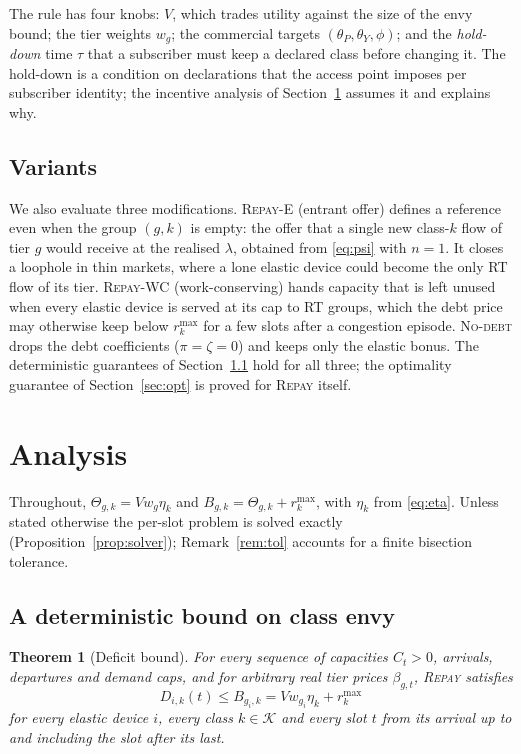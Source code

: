 \documentclass[preprint,11pt]{elsarticle}
\newtheorem{theorem}{Theorem}
\theoremstyle{definition}
\theoremstyle{remark}
\newcommand{\rmax}{r^{\max}}
\newcommand{\cK}{\mathcal{K}}
\newcommand{\repay}{\textsc{Repay}}
\begin{document}
The rule has four knobs: $V$, which trades utility against the size of the envy bound; the tier weights $w_g$; the commercial targets $(\theta_P,\theta_Y,\phi)$; and the \emph{hold-down} time $\tau$ that a subscriber must keep a declared class before changing it.
The hold-down is a condition on declarations that the access point imposes per subscriber identity; the incentive analysis of Section~\ref{sec:analysis} assumes it and explains why.

\subsection{Variants}\label{sec:variants}

We also evaluate three modifications.
\textsc{Repay-E} (entrant offer) defines a reference even when the group $(g,k)$ is empty: the offer that a single new class-$k$ flow of tier $g$ would receive at the realised $\lambda$, obtained from \eqref{eq:psi} with $n=1$. It closes a loophole in thin markets, where a lone elastic device could become the only RT flow of its tier.
\textsc{Repay-WC} (work-conserving) hands capacity that is left unused when every elastic device is served at its cap to RT groups, which the debt price may otherwise keep below $\rmax_k$ for a few slots after a congestion episode.
\textsc{No-debt} drops the debt coefficients ($\pi=\zeta=0$) and keeps only the elastic bonus.
The deterministic guarantees of Section~\ref{sec:envy} hold for all three; the optimality guarantee of Section~\ref{sec:opt} is proved for \repay{} itself.


\section{Analysis}\label{sec:analysis}

Throughout, $\Theta_{g,k}=V w_g\eta_k$ and $B_{g,k}=\Theta_{g,k}+\rmax_k$, with $\eta_k$ from \eqref{eq:eta}.
Unless stated otherwise the per-slot problem is solved exactly (Proposition~\ref{prop:solver}); Remark~\ref{rem:tol} accounts for a finite bisection tolerance.

\subsection{A deterministic bound on class envy}\label{sec:envy}

\begin{theorem}[Deficit bound]\label{thm:bound}
For every sequence of capacities $C_t>0$, arrivals, departures and demand caps, and for arbitrary real tier prices $\beta_{g,t}$, \repay{} satisfies
\[
D_{i,k}(t)\le B_{g_i,k}=V w_{g_i}\eta_k+\rmax_k
\]
for every elastic device $i$, every class $k\in\cK$ and every slot $t$ from its arrival up to and including the slot after its last.
\end{theorem}
\end{document}
